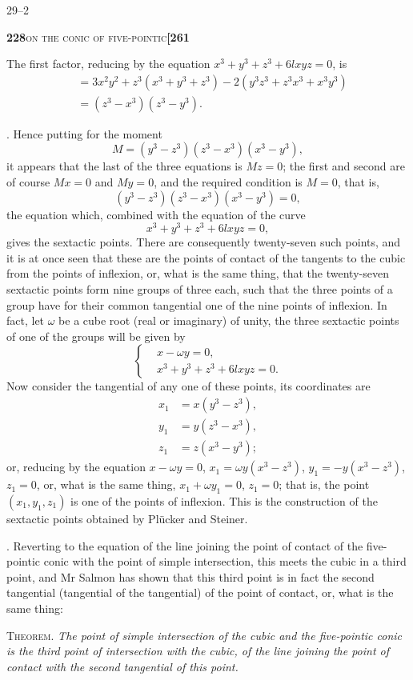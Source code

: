 \documentclass[11pt]{article}
\begin{document}
\hfill 29--2

\newpage

\noindent\textbf{228}\hfill\textsc{on the conic of five-pointic}\hfill\textbf{[261}

\medskip

\noindent The first factor, reducing by the equation $x^3 + y^3 + z^3 + 6lxyz = 0$, is
\[
\begin{aligned}
&= 3x^2y^2 + z^3(x^3 + y^3 + z^3) - 2(y^3z^3 + z^3x^3 + x^3y^3)\\
&= (z^3 - x^3)(z^3 - y^3).
\end{aligned}
\]

\medskip

. Hence putting for the moment
\[
M = (y^3 - z^3)(z^3 - x^3)(x^3 - y^3),
\]
it appears that the last of the three equations is $Mz = 0$; the first and second are of course $Mx = 0$ and $My = 0$, and the required condition is $M = 0$, that is,
\[
(y^3 - z^3)(z^3 - x^3)(x^3 - y^3) = 0,
\]
the equation which, combined with the equation of the curve
\[
x^3 + y^3 + z^3 + 6lxyz = 0,
\]
gives the sextactic points. There are consequently twenty-seven such points, and it is at once seen that these are the points of contact of the tangents to the cubic from the points of inflexion, or, what is the same thing, that the twenty-seven sextactic points form nine groups of three each, such that the three points of a group have for their common tangential one of the nine points of inflexion. In fact, let $\omega$ be a cube root (real or imaginary) of unity, the three sextactic points of one of the groups will be given by
\[
\left\{
\begin{aligned}
&x - \omega y = 0,\\
&x^3 + y^3 + z^3 + 6lxyz = 0.
\end{aligned}
\right.
\]
Now consider the tangential of any one of these points, its coordinates are
\[
\begin{aligned}
x_1 &= x(y^3 - z^3),\\
y_1 &= y(z^3 - x^3),\\
z_1 &= z(x^3 - y^3);
\end{aligned}
\]
or, reducing by the equation $x - \omega y = 0$, $x_1 = \omega y(x^3 - z^3)$, $y_1 = -y(x^3 - z^3)$, $z_1 = 0$, or, what is the same thing, $x_1 + \omega y_1 = 0$, $z_1 = 0$; that is, the point $(x_1, y_1, z_1)$ is one of the points of inflexion. This is the construction of the sextactic points obtained by Pl\"ucker and Steiner.

\medskip

. Reverting to the equation of the line joining the point of contact of the five-pointic conic with the point of simple intersection, this meets the cubic in a third point, and Mr Salmon has shown that this third point is in fact the second tangential (tangential of the tangential) of the point of contact, or, what is the same thing:

\medskip

\noindent\textsc{Theorem.} \textit{The point of simple intersection of the cubic and the five-pointic conic is the third point of intersection with the cubic, of the line joining the point of contact with the second tangential of this point.}
\end{document}
